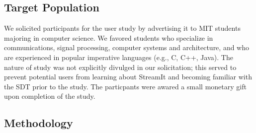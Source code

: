 \documentclass[11pt, letterpaper, onecolumn]{article}
\begin{document}

\subsection{Target Population}

We solicited participants for the  user study by advertising it to MIT
students  majoring  in  computer  science.  We  favored  students  who
specialize in communications,  signal processing, computer systems and
architecture, and who are  experienced in popular imperative languages
(e.g., C, C++, Java).  The nature of study was not explicitly divulged
in  our solicitation;  this  served to  prevent  potential users  from
learning about  StreamIt and becoming  familiar with the SDT  prior to
the  study. The  particpants were  awared a  small monetary  gift upon
completion of the study.


\subsection{Methodology}
\end{document}
